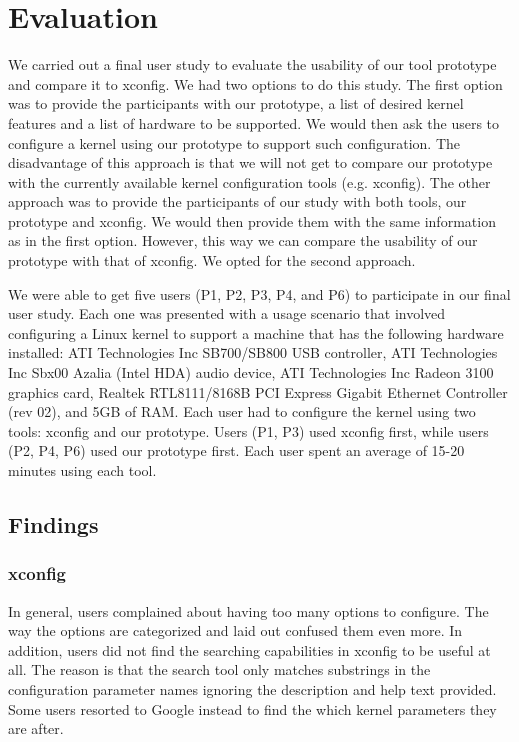 \documentclass{chi2009}
\begin{document}
\section{Evaluation}\label{sec:evaluation}
We carried out a final user study to evaluate the usability of our tool prototype and compare it to \textsf{xconfig}. We had two options to do this study. The
first option was to provide the participants with our prototype, a list of desired kernel features and a list of hardware to be supported. We would then ask the
users to configure a kernel using our prototype to support such configuration. The disadvantage of this approach is that we will not get to compare our
prototype with the currently available kernel configuration tools (e.g. \textsf{xconfig}). The other approach was to provide the participants of our study with
both tools, our prototype and \textsf{xconfig}. We would then provide them with the same information as in the first option. However, this way we can compare
the usability of our prototype with that of \textsf{xconfig}. We opted for the second approach.

We were able to get five users (P1, P2, P3, P4, and P6) to participate in our final user study. Each one was presented with a usage scenario that involved
configuring a Linux kernel to support a machine that has the following hardware installed: ATI Technologies Inc SB700/SB800 USB controller, ATI Technologies Inc
Sbx00 Azalia (Intel HDA) audio device, ATI Technologies Inc Radeon 3100 graphics card, Realtek RTL8111/8168B PCI Express Gigabit Ethernet Controller (rev 02),
and 5GB of RAM. Each user had to configure the kernel using two tools: \textsf{xconfig} and our prototype. Users (P1, P3) used \textsf{xconfig} first, while
users (P2, P4, P6) used our prototype first. Each user spent an average of 15-20 minutes using each tool.

\subsection{Findings}
\subsubsection{\textsf{xconfig}}
In general, users complained about having too many options to configure. The way the options are categorized and laid out confused them even more. In addition,
users did not find the searching capabilities in \textsf{xconfig} to be useful at all. The reason is that the search tool only matches substrings in the
configuration parameter names ignoring the description and help text provided. Some users resorted to Google instead to find the which kernel parameters they
are after.
\end{document}
